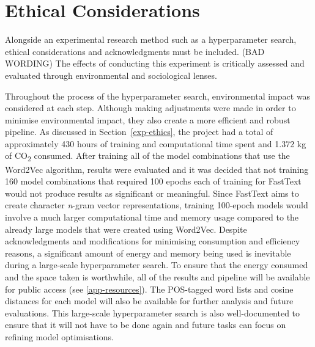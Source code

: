 \section{Ethical Considerations}
\label{sec:ethicalcons}

Alongside an experimental research method such as a hyperparameter search, ethical considerations and acknowledgments must be included. (BAD WORDING) The effects of conducting this experiment is critically assessed and evaluated through environmental and sociological lenses.

Throughout the process of the hyperparameter search, environmental impact was considered at each step. Although making adjustments were made in order to minimise environmental impact, they also create a more efficient and robust pipeline. As discussed in Section~\ref{exp-ethics}, the project had a total of approximately 430 hours of training and computational time spent and 1.372 kg of CO\textsubscript{2} consumed. After training all of the model combinations that use the Word2Vec algorithm, results were evaluated and it was decided that not training 160 model combinations that required 100 epochs each of training for FastText would not produce results as significant or meaningful. Since FastText aims to create character \emph{n}-gram vector representations, training 100-epoch models would involve a much larger computational time and memory usage compared to the already large models that were created using Word2Vec. Despite acknowledgments and modifications for minimising consumption and efficiency reasons, a significant amount of energy and memory being used is inevitable during a large-scale hyperparameter search. To ensure that the energy consumed and the space taken is worthwhile, all of the results and pipeline will be available for public access (see \autoref{app-resources}). The POS-tagged word lists and cosine distances for each model will also be available for further analysis and future evaluations. This large-scale hyperparameter search is also well-documented to ensure that it will not have to be done again and future tasks can focus on refining model optimisations. 

